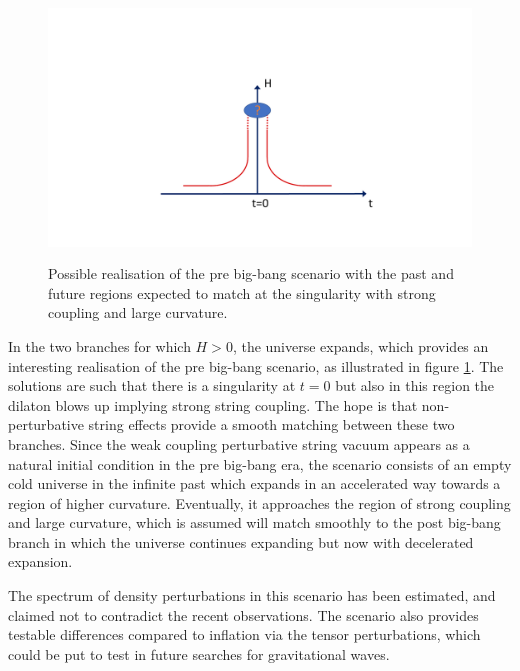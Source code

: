 \begin{figure}[t]
\begin{center}
\includegraphics[width=160mm,height=70mm]{Sections/Figures/PreBigBang.pdf} 
\caption{Possible realisation of the pre big-bang scenario with the past and future regions expected to match at the singularity with strong coupling and large curvature.} \label{PreBigBang} 
\end{center}
\end{figure}

In the two branches for which  $H>0$, the universe expands, which provides an 
interesting realisation of the pre big-bang scenario, as illustrated in figure \ref{PreBigBang}.
The solutions are such that there is  a singularity at $t=0$ but also in this
 region the dilaton blows up implying strong string coupling. 
The hope is that non-perturbative string effects provide a smooth 
matching between these two branches. Since the weak 
coupling perturbative string vacuum appears as a natural initial condition 
in the pre big-bang era, the scenario consists of an empty cold
 universe in the infinite past which expands in an accelerated way 
towards a region of higher curvature. Eventually, it approaches the region of 
strong coupling and large curvature, which is assumed will match smoothly
 to the post big-bang branch in which the universe continues expanding but now with
decelerated expansion.

 The spectrum of density perturbations in this scenario has been estimated, and claimed not to contradict the recent 
observations. The scenario also
provides testable differences compared to inflation via the tensor 
perturbations, which could be put to test in future searches for gravitational waves.

